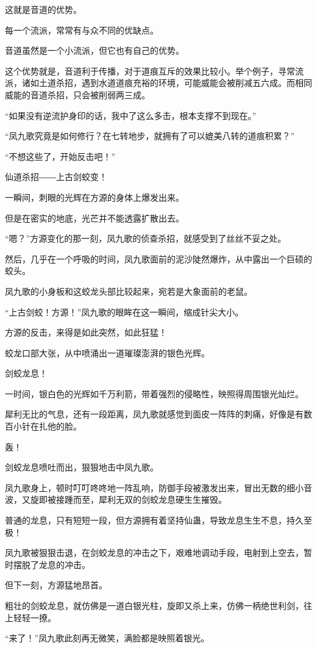 \begin{this_body}
这就是音道的优势。

每一个流派，常常有与众不同的优缺点。

音道虽然是一个小流派，但它也有自己的优势。

这个优势就是，音道利于传播，对于道痕互斥的效果比较小。举个例子，寻常流派，诸如土道杀招，遇到水道道痕充裕的环境，可能威能会被削减五六成。而相同威能的音道杀招，只会被削弱两三成。

“如果没有逆流护身印的话，我中了这么多击，根本支撑不到现在。”

“凤九歌究竟是如何修行？在七转地步，就拥有了可以媲美八转的道痕积累？”

“不想这些了，开始反击吧！”

仙道杀招――上古剑蛟变！

一瞬间，刺眼的光辉在方源的身体上爆发出来。

但是在密实的地底，光芒并不能透露扩散出去。

“嗯？”方源变化的那一刻，凤九歌的侦查杀招，就感受到了丝丝不妥之处。

然后，几乎在一个呼吸的时间，凤九歌面前的泥沙陡然爆炸，从中露出一个巨硕的蛟头。

凤九歌的小身板和这蛟龙头部比较起来，宛若是大象面前的老鼠。

“上古剑蛟！方源！”凤九歌的眼眸在这一瞬间，缩成针尖大小。

方源的反击，来得是如此突然，如此狂猛！

蛟龙口部大张，从中喷涌出一道璀璨澎湃的银色光辉。

剑蛟龙息！

一时间，银白色的光辉如千万利箭，带着强烈的侵略性，映照得周围银光灿烂。

犀利无比的气息，还有一段距离，凤九歌就感觉到面皮一阵阵的刺痛，好像是有数百小针在扎他的脸。

轰！

剑蛟龙息喷吐而出，狠狠地击中凤九歌。

凤九歌身上，顿时叮叮咚咚地一阵乱响，防御手段被激发出来，冒出无数的细小音波，又旋即被接踵而至，犀利无双的剑蛟龙息硬生生摧毁。

普通的龙息，只有短短一段，但方源拥有着坚持仙蛊，导致龙息生生不息，持久至极！

凤九歌被狠狠击退，在剑蛟龙息的冲击之下，艰难地调动手段，电射到上空去，暂时摆脱了龙息的冲击。

但下一刻，方源猛地昂首。

粗壮的剑蛟龙息，就仿佛是一道白银光柱，旋即又杀上来，仿佛一柄绝世利剑，往上轻轻一撩。

“来了！”凤九歌此刻再无微笑，满脸都是映照着银光。


\end{this_body}
